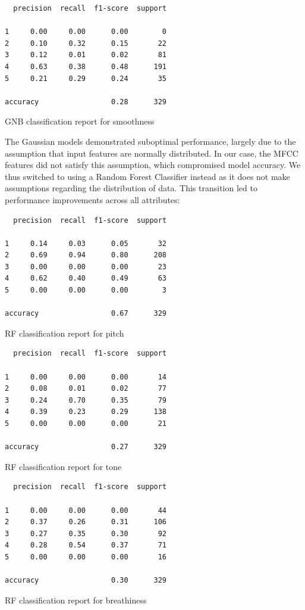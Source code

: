 \documentclass{article}
\begin{document}
\begin{table}
\begin{verbatim}
  precision  recall  f1-score  support

1     0.00     0.00      0.00        0
2     0.10     0.32      0.15       22
3     0.12     0.01      0.02       81
4     0.63     0.38      0.48      191
5     0.21     0.29      0.24       35

accuracy                 0.28      329
\end{verbatim}
\caption{GNB classification report for smoothness}
\label{tab:gsmooth}
\end{table}

The Gaussian models demonstrated suboptimal performance, largely due to the assumption that input features are normally distributed. In our case, the MFCC features did not satisfy this assumption, which compromised model accuracy. We thus switched to using a Random Forest Classifier instead as it does not make assumptions regarding the distribution of data. This transition led to performance improvements across all attributes:

\begin{table}
\begin{verbatim}
  precision  recall  f1-score  support

1     0.14     0.03      0.05       32
2     0.69     0.94      0.80      208
3     0.00     0.00      0.00       23
4     0.62     0.40      0.49       63
5     0.00     0.00      0.00        3

accuracy                 0.67      329
\end{verbatim}
\caption{RF classification report for pitch}
\end{table}

\begin{table}
\begin{verbatim}
  precision  recall  f1-score  support

1     0.00     0.00      0.00       14
2     0.08     0.01      0.02       77
3     0.24     0.70      0.35       79
4     0.39     0.23      0.29      138
5     0.00     0.00      0.00       21

accuracy                 0.27      329
\end{verbatim}
\caption{RF classification report for tone}
\end{table}

\begin{table}
\begin{verbatim}
  precision  recall  f1-score  support

1     0.00     0.00      0.00       44
2     0.37     0.26      0.31      106
3     0.27     0.35      0.30       92
4     0.28     0.54      0.37       71
5     0.00     0.00      0.00       16

accuracy                 0.30      329
\end{verbatim}
\caption{RF classification report for breathiness}
\end{table}
\end{document}
